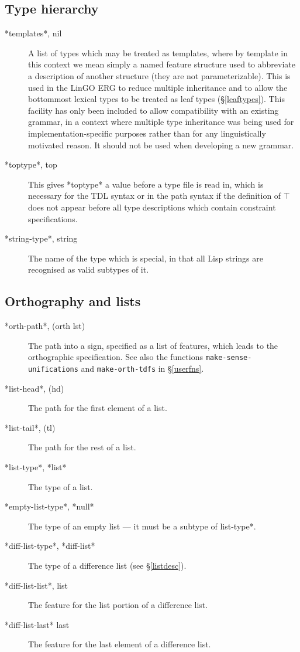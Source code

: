 \documentclass[12pt]{report}
\newcommand{\functionname}[1]{{\tt #1}}
\begin{document}
\subsection{Type hierarchy}
\label{thierglob}
\begin{description}
\item [*templates*, nil] A list of types which may be treated as 
templates, where by template in this context we mean simply a named
feature structure used to abbreviate a description of another structure
(they are not parameterizable).
This is used in the LinGO ERG to reduce multiple inheritance
and to allow the bottommost lexical types to be treated as leaf types
(\S\ref{leaftypes}).  This facility has only been included to allow
compatibility with an existing grammar, in a context where
multiple type inheritance was being used for implementation-specific 
purposes rather than for any linguistically motivated reason.
It should not be used when developing a new grammar.
\item [*toptype*, top] This gives *toptype* a value before a type file
is read in, which is necessary for the TDL syntax or in the path syntax
if the definition of $\top$ does not
appear before all type descriptions which contain constraint specifications.
\item [*string-type*, string] The name of the type which is special, in that
all Lisp strings are recognised as valid subtypes of it.
\end{description}
\subsection{Orthography and lists}
\label{olglob}
\begin{description}
\item [*orth-path*, (orth lst)]  The path into a sign, specified 
as a list of features, which leads to the orthographic specification.
See also the functions 
\functionname{make-sense-unifications} and \functionname{make-orth-tdfs}
in \S\ref{userfns}.
\item[*list-head*, (hd)]  The path for the first element of a list.
\item[*list-tail*, (tl)] The path for the rest of a list.
\item[*list-type*, *list*] The type of a list.
\item[*empty-list-type*, *null*] The type of an empty list --- 
it must be a subtype of {\type *list-type*}.
\item[*diff-list-type*, *diff-list*]  The type of a difference list (see
\S\ref{listdesc}).
\item[*diff-list-list*, list] The feature for the list portion
of a difference list.
\item[*diff-list-last* last] The feature for the last element of a difference list.
\end{description}
\end{document}
